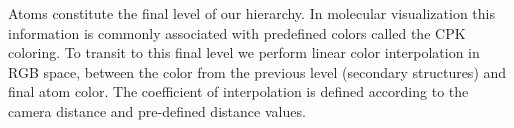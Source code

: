 \documentclass[review,journal]{vgtc}         %
\begin{document}
Atoms constitute the final level of our hierarchy.
In molecular visualization this information is commonly associated with predefined colors called the CPK coloring.
To transit to this final level we perform linear color interpolation in RGB space, between the color from the previous level (secondary structures) and final atom color.
The coefficient of interpolation is defined according to the camera distance and pre-defined distance values.

%
%
%
%
%

%
%
%
%
%
%
%
%
%
\end{document}
